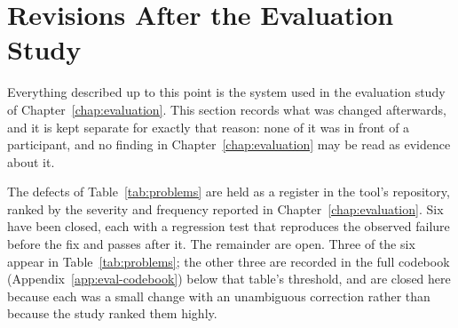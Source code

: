 \section{Revisions After the Evaluation Study}
\label{sec:impl-post-study}

Everything described up to this point is the system used in the evaluation study of Chapter~\ref{chap:evaluation}. This section records what was changed afterwards, and it is kept separate for exactly that reason: none of it was in front of a participant, and no finding in Chapter~\ref{chap:evaluation} may be read as evidence about it.

The defects of Table~\ref{tab:problems} are held as a register in the tool's repository, ranked by the severity and frequency reported in Chapter~\ref{chap:evaluation}. Six have been closed, each with a regression test that reproduces the observed failure before the fix and passes after it. The remainder are open. Three of the six appear in Table~\ref{tab:problems}; the other three are recorded in the full codebook (Appendix~\ref{app:eval-codebook}) below that table's threshold, and are closed here because each was a small change with an unambiguous correction rather than because the study ranked them highly.

